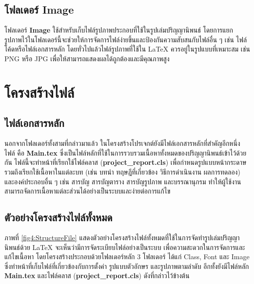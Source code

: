 \subsection{โฟลเดอร์ Image}
\hspace*{1.5em}
โฟลเดอร์ \textbf{Image} ใช้สำหรับเก็บไฟล์รูปภาพประกอบที่ใช้ในรูปเล่มปริญญานิพนธ์ โดยการแยกรูปภาพไว้ในโฟลเดอร์นี้จะช่วยให้การจัดการไฟล์ง่ายขึ้นและป้องกันความสับสนกับไฟล์อื่น ๆ เช่น ไฟล์โค้ดหรือไฟล์เอกสารหลัก โดยทั่วไปแล้วไฟล์รูปภาพที่ใช้ใน LaTeX ควรอยู่ในรูปแบบที่เหมาะสม เช่น PNG หรือ JPG เพื่อให้สามารถแสดงผลได้ถูกต้องและมีคุณภาพสูง

\section{โครงสร้างไฟล์}
\subsection{ไฟล์เอกสารหลัก}
\hspace*{1.5em}
นอกจากโฟลเดอร์ทั้งสามที่กล่าวมาแล้ว ในโครงสร้างโปรเจกต์ยังมีไฟล์เอกสารหลักที่สำคัญอีกหนึ่งไฟล์ คือ \textbf{Main.tex} ซึ่งเป็นไฟล์หลักที่ใช้ในการรวบรวมเนื้อหาทั้งหมดของปริญญานิพนธ์เข้าไว้ด้วยกัน ไฟล์นี้จะทำหน้าที่เรียกใช้ไฟล์คลาส (\textbf{project\_report.cls}) เพื่อกำหนดรูปแบบหน้ากระดาษ รวมถึงเรียกใช้เนื้อหาในแต่ละบท (เช่น บทนำ ทฤษฎีที่เกี่ยวข้อง วิธีการดำเนินงาน ผลการทดลอง) และองค์ประกอบอื่น ๆ เช่น สารบัญ สารบัญตาราง สารบัญรูปภาพ และบรรณานุกรม ทำให้ผู้ใช้งานสามารถจัดการเนื้อหาแต่ละส่วนได้อย่างเป็นระบบและง่ายต่อการแก้ไข

\subsection{ตัวอย่างโครงสร้างไฟล์ทั้งหมด}
\hspace*{1.5em}
ภาพที่ \ref{fig4:StructureFile} แสดงตัวอย่างโครงสร้างไฟล์ทั้งหมดที่ใช้ในการจัดทำรูปเล่มปริญญานิพนธ์ด้วย LaTeX จะเห็นว่ามีการจัดระเบียบไฟล์อย่างเป็นระบบ เพื่อความสะดวกในการจัดการและแก้ไขเนื้อหา โดยโครงสร้างประกอบด้วยโฟลเดอร์หลัก 3 โฟลเดอร์ ได้แก่ Class, Font และ Image ซึ่งทำหน้าที่เก็บไฟล์ที่เกี่ยวข้องกับการตั้งค่า รูปแบบตัวอักษร และรูปภาพตามลำดับ อีกทั้งยังมีไฟล์หลัก \textbf{Main.tex} และไฟล์คลาส (\textbf{project\_report.cls}) ดังที่กล่าวไว้ข้างต้น


